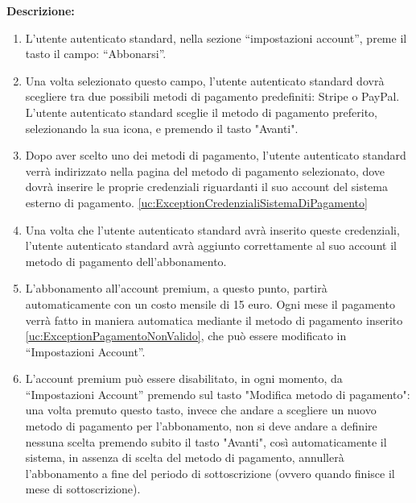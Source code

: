 \begin{listaPersonale}[UC]{}
\begin{listaPersonale2}[UC] {}
        \textbf{Descrizione:}
        \begin{enumerate}
            \item L'utente autenticato standard, nella sezione “impostazioni account”, preme il tasto il campo: “Abbonarsi”.
            \item Una volta selezionato questo campo, l'utente autenticato standard dovrà scegliere tra due possibili metodi di pagamento predefiniti: Stripe o PayPal. L'utente autenticato standard sceglie il metodo di pagamento preferito, selezionando la sua icona, e premendo il tasto "Avanti".
            \item Dopo aver scelto uno dei metodi di pagamento, l'utente autenticato standard verrà indirizzato nella pagina del metodo di pagamento selezionato, dove dovrà inserire le proprie credenziali riguardanti il suo account del sistema esterno di pagamento. \ref{uc:ExceptionCredenzialiSistemaDiPagamento}
            \item Una volta che l'utente autenticato standard avrà inserito queste credenziali, l'utente autenticato standard avrà aggiunto correttamente al suo account il metodo di pagamento dell'abbonamento.
            \item L'abbonamento all'account premium, a questo punto, partirà automaticamente con un costo mensile di 15 euro. Ogni mese il pagamento verrà fatto in maniera automatica mediante il metodo di pagamento inserito \ref{uc:ExceptionPagamentoNonValido}, che può essere modificato in “Impostazioni Account”. 
            \item L'account premium può essere disabilitato, in ogni momento, da “Impostazioni Account” premendo sul tasto "Modifica metodo di pagamento": una volta premuto questo tasto, invece che andare a scegliere un nuovo metodo di pagamento per l'abbonamento, non si deve andare a definire nessuna scelta premendo subito il tasto "Avanti", così automaticamente il sistema, in assenza di scelta del metodo di pagamento, annullerà l'abbonamento a fine del periodo di sottoscrizione (ovvero quando finisce il mese di sottoscrizione).
        \end{enumerate}



\end{listaPersonale2}
\end{listaPersonale}
